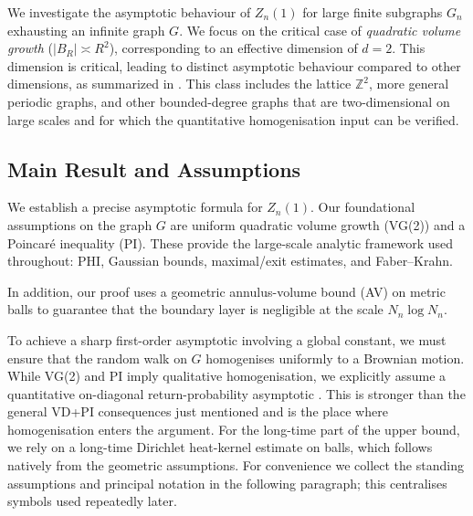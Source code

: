 \documentclass[reqno]{amsart}
\numberwithin{equation}{section}
\theoremstyle{definition}
\theoremstyle{remark}
\begin{document}
We investigate the asymptotic behaviour of $Z_n(1)$ for large finite subgraphs $G_n$ exhausting an infinite graph $G$. We focus on the critical case of \emph{quadratic volume growth} ($|B_R| \asymp R^2$), corresponding to an effective dimension of $d=2$. This dimension is critical, leading to distinct asymptotic behaviour compared to other dimensions, as summarized in . This class includes the lattice $\mathbb{Z}^2$, more general periodic graphs, and other bounded-degree graphs that are two-dimensional on large scales and for which the quantitative homogenisation input can be verified.

\subsection{Main Result and Assumptions}
We establish a precise asymptotic formula for $Z_n(1)$. Our foundational assumptions on the graph $G$ are uniform quadratic volume growth (VG(2)) and a Poincaré inequality (PI). These provide the large-scale analytic framework used throughout: PHI, Gaussian bounds, maximal/exit estimates, and Faber--Krahn.

In addition, our proof uses a geometric annulus-volume bound (AV) on metric balls to guarantee that the boundary layer is negligible at the scale $N_n\log N_n$.

To achieve a sharp first-order asymptotic involving a global constant, we must ensure that the random walk on $G$ homogenises uniformly to a Brownian motion. While VG(2) and PI imply qualitative homogenisation, we explicitly assume a quantitative on-diagonal return-probability asymptotic . This is stronger than the general VD+PI consequences just mentioned and is the place where homogenisation enters the argument. For the long-time part of the upper bound, we rely on a long-time Dirichlet heat-kernel estimate on balls, which follows natively from the geometric assumptions. For convenience we collect the standing assumptions and principal notation in the following paragraph; this centralises symbols used repeatedly later.
\end{document}
